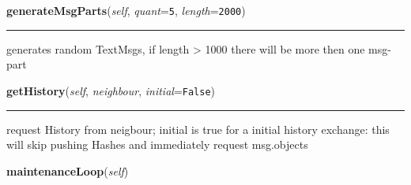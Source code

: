     \vspace{0.5ex}

\hspace{.8\funcindent}\begin{boxedminipage}{\funcwidth}

    \raggedright \textbf{generateMsgParts}(\textit{self}, \textit{quant}={\tt 5}, \textit{length}={\tt 2000})

    \vspace{-1.5ex}

    \rule{\textwidth}{0.5\fboxrule}
\setlength{\parskip}{2ex}
    generates random TextMsgs, if length {\textgreater} 1000 there will be 
    more then one msg-part

\setlength{\parskip}{1ex}
    \end{boxedminipage}

    \label{peer:Peer:getHistory}

    \vspace{0.5ex}

\hspace{.8\funcindent}\begin{boxedminipage}{\funcwidth}

    \raggedright \textbf{getHistory}(\textit{self}, \textit{neighbour}, \textit{initial}={\tt False})

    \vspace{-1.5ex}

    \rule{\textwidth}{0.5\fboxrule}
\setlength{\parskip}{2ex}
    request History from neigbour; initial is true for a initial history 
    exchange: this will skip pushing Hashes and immediately request 
    msg.objects

\setlength{\parskip}{1ex}
    \end{boxedminipage}

    \label{peer:Peer:maintenanceLoop}

    \vspace{0.5ex}

\hspace{.8\funcindent}\begin{boxedminipage}{\funcwidth}

    \raggedright \textbf{maintenanceLoop}(\textit{self})

\setlength{\parskip}{2ex}
\setlength{\parskip}{1ex}
    \end{boxedminipage}

